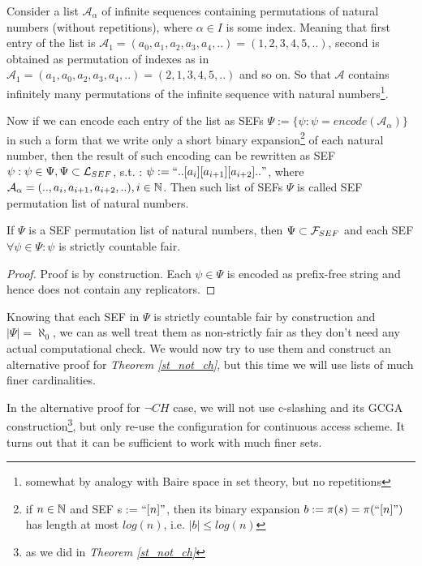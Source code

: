 \begin{definition}
  Consider a list $\mathcal{A}_\alpha$ of infinite sequences containing permutations of natural numbers (without repetitions), where $\alpha \in I$ is some index. Meaning that first entry of the list is $\mathcal{A}_1=(a_0,a_1,a_2,a_3,a_4,..)=(1,2,3,4,5,..)$, second is obtained as permutation of indexes as in $\mathcal{A}_1=(a_1,a_0,a_2,a_3,a_4,..)=(2,1,3,4,5,..)$ and so on. So that $\mathcal{A}$ contains infinitely many permutations of the infinite sequence with natural numbers\footnote{somewhat by analogy with Baire space in set theory, but no repetitions}.

  Now if we can encode each entry of the list as SEFs $\Psi := \{\psi : \psi = encode(\mathcal{A}_\alpha)\}$ in such a form that we write only a short binary expansion\footnote{if $n \in \mathbb{N}$ and SEF s := $\text{``} [n] \text{''}$, then its binary expansion $b := \pi(s) = \pi(\text{``} [n] \text{''})$ has length at most $log(n)$, i.e. $|b| \leq log(n)$} of each natural number, then the result of such encoding can be rewritten as SEF $\psi : \psi \in \Psi, \Psi \subset \mathcal{L}_{SEF}$, s.t. : $\psi := \text{``} ..[a_i][a_{i+1}][a_{i+2}].. \text{''}$, where $\mathcal{A}_\alpha=(..,a_i,a_{i+1},a_{i+2},..), i \in \mathbb{N} $. Then such list of SEFs $\Psi$ is called SEF permutation list of natural numbers.
\end{definition}

\begin{lemma}
  If $\Psi$ is a SEF permutation list of natural numbers, then $\Psi \subset \mathcal{F}_{SEF}$ and each SEF $\forall \psi \in \Psi: \psi$ is strictly countable fair.
\end{lemma}
\begin{proof}
  Proof is by construction. Each $\psi \in \Psi$ is encoded as prefix-free string and hence does not contain any replicators.
\end{proof}

Knowing that each SEF in $\Psi$ is strictly countable fair by construction and $|\Psi| = \aleph_0$, we can as well treat them as non-strictly fair as they don't need any actual computational check.
We would now try to use them and construct an alternative proof for \textit{Theorem \ref{st_not_ch}}, but this time we will use lists of much finer cardinalities.


In the alternative proof for $\neg CH$ case, we will not use c-slashing and its GCGA construction\footnote{as we did in \textit{Theorem \ref{st_not_ch}}}, but only re-use the configuration for continuous access scheme. It turns out that it can be sufficient to work with much finer sets.

